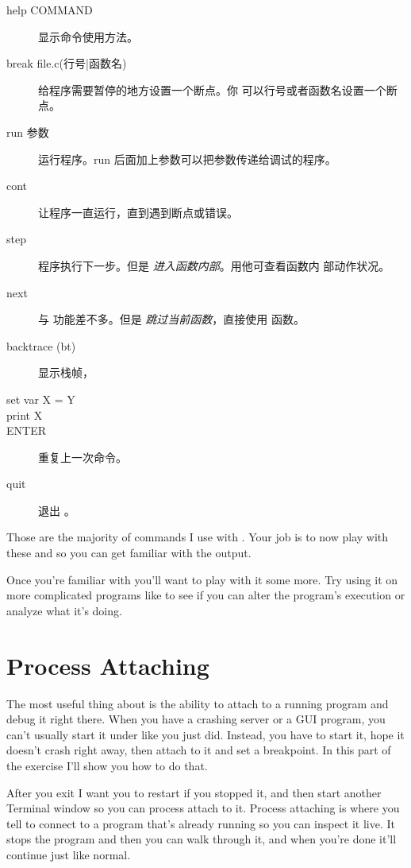\begin{enumerate}
\begin{description}
\item[help COMMAND] 显示命令使用方法。
\item[break file.c(行号|函数名)] 给程序需要暂停的地方设置一个断点。你
  可以行号或者函数名设置一个断点。
\item[run 参数] 运行程序。run 后面加上参数可以把参数传递给调试的程序。
\item[cont] 让程序一直运行，直到遇到断点或错误。
\item[step] 程序执行下一步。但是 \emph{进入函数内部}。用他可查看函数内
  部动作状况。
\item[next] 与  功能差不多。但是 \emph{跳过当前函数}，直接使用
  函数。
\item[backtrace (bt)] 显示栈帧，
\item[set var X = Y]
\item[print X] 
\item[ENTER] 重复上一次命令。
\item[quit] 退出 。
\end{description}




Those are the majority of commands I use with .  Your job is to
now play with these and  so you can get familiar with the output.

Once you're familiar with  you'll want to play with it some more.
Try using it on more complicated programs like  to see if you
can alter the program's execution or analyze what it's doing.


\section{Process Attaching}

The most useful thing about  is the ability to attach to a running program and
debug it right there.  When you have a crashing server or a GUI program, you can't
usually start it under  like you just did.  Instead, you have to start
it, hope it doesn't crash right away, then attach to it and set a breakpoint.  In
this part of the exercise I'll show you how to do that.

After you exit  I want you to restart  if you
stopped it, and then start another Terminal window so you can process attach to
it.  Process attaching is where you tell  to connect to a program
that's already running so you can inspect it live.  It stops the program and
then you can walk through it, and when you're done it'll continue just like
normal.


\end{enumerate}
